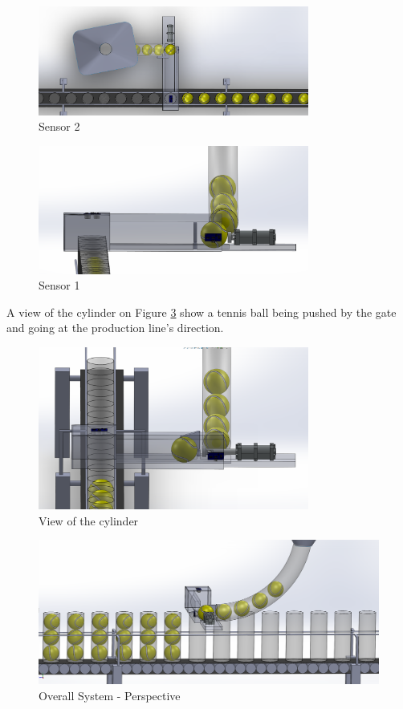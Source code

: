 \documentclass[transmag]{IEEEtran}
\begin{document}
\begin{figure}[h]
\centerline{\includegraphics[width=3.5in]{./images/SecondUT}}
\caption{Sensor 2\label{SecondUT}}
\end{figure}

\begin{figure}[h]
\centerline{\includegraphics[width=3.5in]{./images/FirstUT}}
\caption{Sensor 1\label{FirstUT}}
\end{figure}

A view of the cylinder on Figure \ref{Line3} show a tennis ball being pushed by the gate and going at the production line's direction.

\begin{figure}[h]
\centerline{\includegraphics[width=3.5in]{./images/Line3}}
\caption{View of the cylinder\label{Line3}}
\end{figure}



\begin{figure}
\centerline{\includegraphics[width=7in]{./images/Line2}}
\caption{Overall System - Perspective\label{Line2}}
\end{figure}
\end{document}

